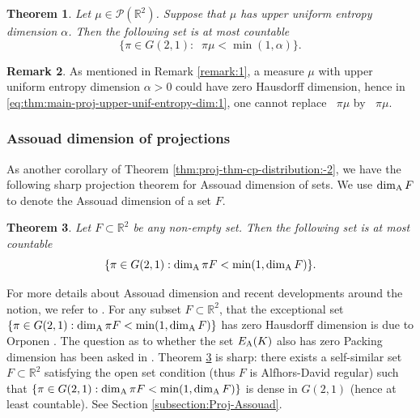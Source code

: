 \documentclass[a4paper,11pt]{amsart}
\newtheorem{theorem}{Theorem}[section]
\theoremstyle{definition}
\newtheorem{remark}[theorem]{Remark}
\numberwithin{equation}{section}
\def\cP{\mathcal P}
\def\R{\mathbb R}
\DeclareMathOperator{\dimH}{dim_H}
\DeclareMathOperator{\dimP}{dim_P}
\begin{document}
\begin{theorem}\label{thm:main-proj-upper-unif-entropy-dim}
Let $\mu\in \cP(\R^2)$. Suppose that $\mu$ has upper uniform entropy dimension $\alpha$.
Then the following set is at most countable
\begin{equation}\label{eq:thm:main-proj-upper-unif-entropy-dim:1}
\{\pi\in G(2,1): \dimP \pi\mu <\min (1,\alpha)\}.
\end{equation}
\end{theorem}

\begin{remark}
As mentioned in Remark \ref{remark:1},  a measure $\mu$ with  upper uniform entropy dimension $\alpha>0$ could have zero Hausdorff dimension,  hence in \eqref{eq:thm:main-proj-upper-unif-entropy-dim:1}, one cannot replace $\dimP \pi\mu$ by $\dimH \pi\mu$. 
\end{remark}

\subsubsection{Assouad dimension of projections}\label{section: assouad-projection:0}
As another corollary of Theorem \ref{thm:proj-thm-cp-distribution:-2}, we have the following sharp projection theorem for Assouad dimension of sets.  We use $\dim_{\rm A}F$ to denote the Assouad dimension of a set $F$.  

\begin{theorem}\label{thm:proj-Assouad:-1}
Let $F \subset \R^2$ be any non-empty set. Then the following set is at most countable
\[
\{\pi\in G(2,1): \dim_{\rm A}\pi F<\min(1,\dim_{\rm A}F)\}.
\]
\end{theorem}
For more details about Assouad dimension and recent developments around the notion,    we refer to \cite{Fraser-book}.  For any subset $F \subset \R^2$,  that the exceptional set $\{\pi\in G(2,1): \dim_{\rm A}\pi F<\min(1,\dim_{\rm A}F)\}$ has zero Hausdorff dimension is due to Orponen \cite{Orponen-Assouad}. The question as to whether the set $E_{\rm A}(K)$ also has zero Packing dimension has been asked in  \cite{Orponen-Assouad, Fraser-book}. 
Theorem \ref{thm:proj-Assouad:-1} is sharp: there exists a self-similar set $F\subset \R^2$ satisfying the open set condition (thus $F$ is Alfhors-David regular) such that $\{\pi\in G(2,1): \dim_{\rm A}\pi F<\min(1,\dim_{\rm A}F)\}$  is dense in $G(2,1)$ (hence at least countable).  See Section \ref{subsection:Proj-Assouad}.
\end{document}
